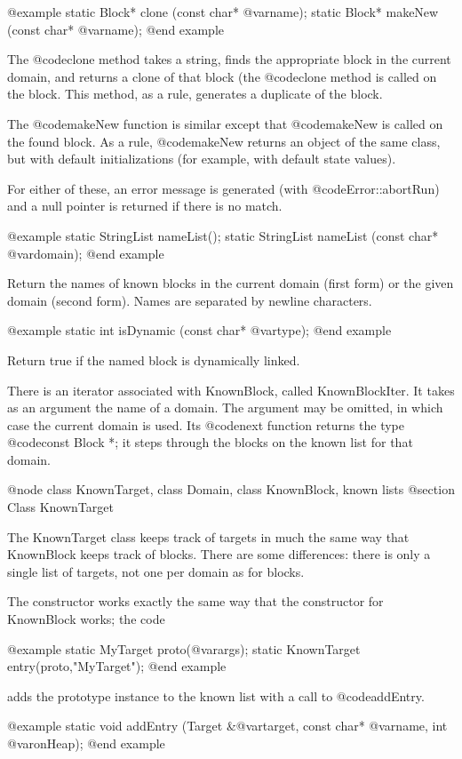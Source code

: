 @example
static Block* clone (const char* @var{name});
static Block* makeNew (const char* @var{name});
@end example

The @code{clone} method takes a string, finds the appropriate block in
the current domain, and returns a clone of that block (the
@code{clone} method is called on the block.  This method, as
a rule, generates a duplicate of the block.

The @code{makeNew} function is similar except that @code{makeNew}
is called on the found block.  As a rule, @code{makeNew} returns
an object of the same class, but with default initializations
(for example, with default state values).

For either of these, an error message is generated (with
@code{Error::abortRun}) and a null pointer is returned if there is no
match.

@example
static StringList nameList();
static StringList nameList (const char* @var{domain});
@end example

Return the names of known blocks in the current domain (first form) or
the given domain (second form).  Names are
separated by newline characters.

@example
static int isDynamic (const char* @var{type});
@end example

Return true if the named block is dynamically linked.

There is an iterator associated with KnownBlock, called
KnownBlockIter.  It takes as an argument the name of a domain.  The
argument may be omitted, in which case the current domain is used.
Its @code{next} function returns the type @code{const Block *}; it
steps through the blocks on the known list for that domain.

@node class KnownTarget, class Domain, class KnownBlock, known lists
@section Class KnownTarget

The KnownTarget class keeps track of targets in much the same way
that KnownBlock keeps track of blocks.  There are some differences:
there is only a single list of targets, not one per domain as for
blocks.

The constructor works exactly the same way that the constructor for
KnownBlock works; the code

@example
static MyTarget proto(@var{args});
static KnownTarget entry(proto,"MyTarget");
@end example

adds the prototype instance to the known list with a call to
@code{addEntry}.

@example
static void addEntry (Target &@var{target}, const char* @var{name}, int @var{onHeap});
@end example

